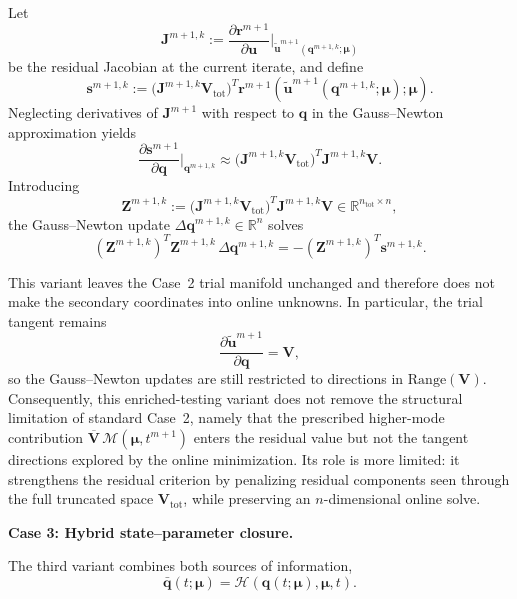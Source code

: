 \documentclass[11pt]{article}
\begin{document}
Let
\[
\mathbf J^{m+1,k}
:=
\frac{\partial \mathbf r^{m+1}}{\partial \mathbf u}
\bigg|_{\tilde{\mathbf u}^{m+1}(\mathbf q^{m+1,k};\bm\mu)}
\]
be the residual Jacobian at the current iterate, and define
\[
\mathbf s^{m+1,k}
:=
\bigl(\mathbf J^{m+1,k}\mathbf V_{\mathrm{tot}}\bigr)^T
\mathbf r^{m+1}\!\left(
\tilde{\mathbf u}^{m+1}(\mathbf q^{m+1,k};\bm\mu);\bm\mu
\right).
\]
Neglecting derivatives of \(\mathbf J^{m+1}\) with respect to \(\mathbf q\) in
the Gauss--Newton approximation yields
\begin{equation}
\frac{\partial \mathbf s^{m+1}}{\partial \mathbf q}
\bigg|_{\mathbf q^{m+1,k}}
\approx
\bigl(\mathbf J^{m+1,k}\mathbf V_{\mathrm{tot}}\bigr)^T
\mathbf J^{m+1,k}\mathbf V.
\label{eq:case2_enriched_jacobian_short}
\end{equation}
Introducing
\begin{equation}
\mathbf Z^{m+1,k}
:=
\bigl(\mathbf J^{m+1,k}\mathbf V_{\mathrm{tot}}\bigr)^T
\mathbf J^{m+1,k}\mathbf V
\in\mathbb R^{n_{\mathrm{tot}}\times n},
\label{eq:case2_enriched_Z_short}
\end{equation}
the Gauss--Newton update \(\Delta\mathbf q^{m+1,k}\in\mathbb R^n\) solves
\begin{equation}
(\mathbf Z^{m+1,k})^T\mathbf Z^{m+1,k}\,\Delta\mathbf q^{m+1,k}
=
-(\mathbf Z^{m+1,k})^T\mathbf s^{m+1,k}.
\label{eq:case2_enriched_gn_short}
\end{equation}

This variant leaves the Case~2 trial manifold unchanged and therefore does not
make the secondary coordinates into online unknowns. In particular, the trial
tangent remains
\[
\frac{\partial \tilde{\mathbf u}^{m+1}}{\partial \mathbf q}=\mathbf V,
\]
so the Gauss--Newton updates are still restricted to directions in
\(\mathrm{Range}(\mathbf V)\). Consequently, this enriched-testing variant does
not remove the structural limitation of standard Case~2, namely that the
prescribed higher-mode contribution
\(\overline{\mathbf V}\,\mathcal M(\bm\mu,t^{m+1})\) enters the residual value
but not the tangent directions explored by the online minimization. Its role is
more limited: it strengthens the residual criterion by penalizing residual
components seen through the full truncated space \(\mathbf V_{\mathrm{tot}}\),
while preserving an \(n\)-dimensional online solve.

\medskip
\noindent
\textbf{Case 3: Hybrid state--parameter closure.}

The third variant combines both sources of information,
\begin{equation}
\bar{\mathbf q}(t;\bm\mu)
=
\mathcal H(\mathbf q(t;\bm\mu),\bm\mu,t).
\end{equation}
\end{document}
